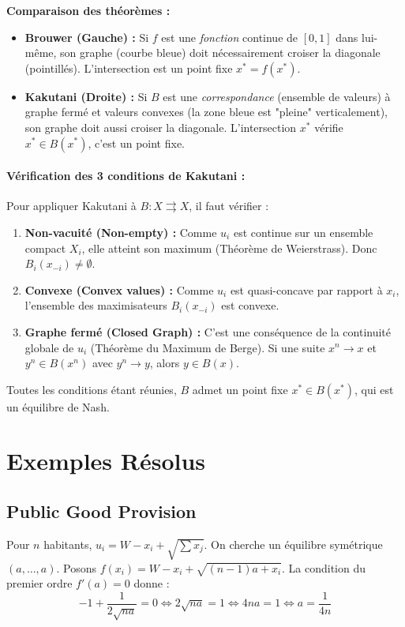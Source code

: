 \begin{figureexplanation}
\textbf{Comparaison des théorèmes :}
\begin{itemize}
    \item \textbf{Brouwer (Gauche) :} Si $f$ est une \textit{fonction} continue de $[0,1]$ dans lui-même, son graphe (courbe bleue) doit nécessairement croiser la diagonale (pointillés). L'intersection est un point fixe $x^* = f(x^*)$.
    \item \textbf{Kakutani (Droite) :} Si $B$ est une \textit{correspondance} (ensemble de valeurs) à graphe fermé et valeurs convexes (la zone bleue est "pleine" verticalement), son graphe doit aussi croiser la diagonale. L'intersection $x^*$ vérifie $x^* \in B(x^*)$, c'est un point fixe.
\end{itemize}
\end{figureexplanation}

\paragraph{Vérification des 3 conditions de Kakutani :}
Pour appliquer Kakutani à $B : X \rightrightarrows X$, il faut vérifier :
\begin{enumerate}
    \item \textbf{Non-vacuité (Non-empty) :} Comme $u_i$ est continue sur un ensemble compact $X_i$, elle atteint son maximum (Théorème de Weierstrass). Donc $B_i(x_{-i}) \ne \emptyset$.
    \item \textbf{Convexe (Convex values) :} Comme $u_i$ est quasi-concave par rapport à $x_i$, l'ensemble des maximisateurs $B_i(x_{-i})$ est convexe.
    \item \textbf{Graphe fermé (Closed Graph) :} C'est une conséquence de la continuité globale de $u_i$ (Théorème du Maximum de Berge). Si une suite $x^n \to x$ et $y^n \in B(x^n)$ avec $y^n \to y$, alors $y \in B(x)$.
\end{enumerate}
Toutes les conditions étant réunies, $B$ admet un point fixe $x^* \in B(x^*)$, qui est un équilibre de Nash.

\section{Exemples Résolus}

\subsection{Public Good Provision}
Pour $n$ habitants, $u_i = W - x_i + \sqrt{\sum x_j}$. On cherche un équilibre symétrique $(a, \dots, a)$.
Posons $f(x_i) = W - x_i + \sqrt{(n-1)a + x_i}$. La condition du premier ordre $f'(a) = 0$ donne :
$$-1 + \frac{1}{2\sqrt{na}} = 0 \iff 2\sqrt{na} = 1 \iff 4na = 1 \iff a = \frac{1}{4n}$$

